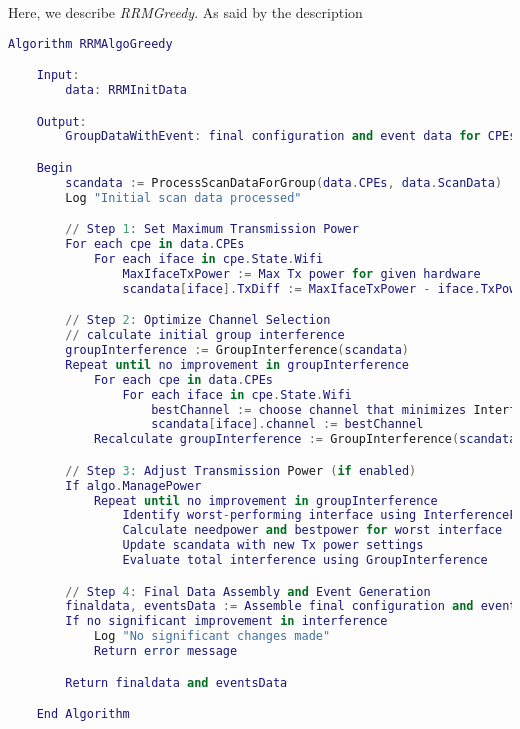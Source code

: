 Here, we describe \textit{RRMGreedy}.
As said by the description

\begin{lstlisting}[language={Lua}, caption=greedy RRM algorithm, label=lst:greedy]
    Algorithm RRMAlgoGreedy

    Input:
        data: RRMInitData

    Output:
        GroupDataWithEvent: final configuration and event data for CPEs

    Begin
        scandata := ProcessScanDataForGroup(data.CPEs, data.ScanData)
        Log "Initial scan data processed"

        // Step 1: Set Maximum Transmission Power
        For each cpe in data.CPEs
            For each iface in cpe.State.Wifi
                MaxIfaceTxPower := Max Tx power for given hardware
                scandata[iface].TxDiff := MaxIfaceTxPower - iface.TxPower

        // Step 2: Optimize Channel Selection
        // calculate initial group interference
        groupInterference := GroupInterference(scandata)
        Repeat until no improvement in groupInterference
            For each cpe in data.CPEs
                For each iface in cpe.State.Wifi
                    bestChannel := choose channel that minimizes InterferenceOnCPE(scandata, channel, width)
                    scandata[iface].channel := bestChannel
            Recalculate groupInterference := GroupInterference(scandata)

        // Step 3: Adjust Transmission Power (if enabled)
        If algo.ManagePower
            Repeat until no improvement in groupInterference
                Identify worst-performing interface using InterferenceFromCPE
                Calculate needpower and bestpower for worst interface
                Update scandata with new Tx power settings
                Evaluate total interference using GroupInterference

        // Step 4: Final Data Assembly and Event Generation
        finaldata, eventsData := Assemble final configuration and events
        If no significant improvement in interference
            Log "No significant changes made"
            Return error message

        Return finaldata and eventsData

    End Algorithm
\end{lstlisting}

